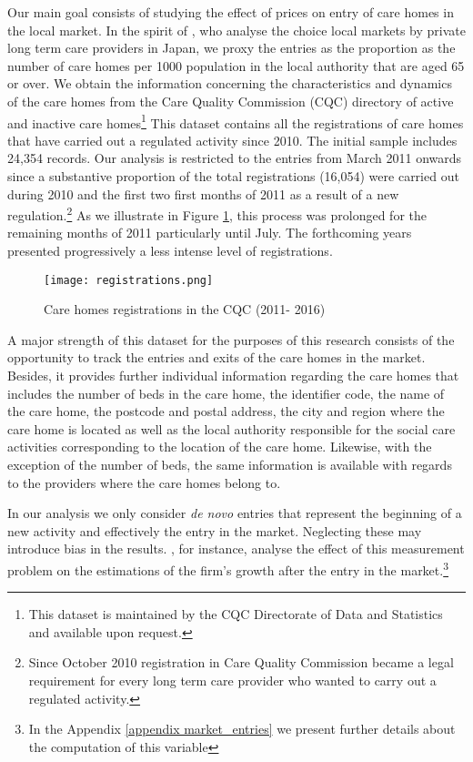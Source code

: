 \documentclass[12pt,letterpaper]{article}
\begin{document}
  
   Our main goal consists of studying the effect of prices on entry of care 
   homes in the local market. In the spirit of \citet{tokunaga2013factors}, who analyse
 the choice local markets by private long term care providers in Japan, we proxy the entries as the proportion as the number
  of care homes per 1000 population in the local authority that
 are aged 65 or over. We obtain the information concerning the characteristics and dynamics of the
care homes from the Care Quality Commission (CQC) directory of active and inactive
care homes\footnote{This dataset is maintained by the CQC Directorate of Data and Statistics and available upon request.}
This dataset contains all the registrations of care homes that have carried out a regulated activity since
   2010. The initial sample includes 24,354 records. Our analysis is restricted to the entries from March
    2011 onwards since a substantive proportion of the total registrations (16,054) were 
     carried out during 2010 and the first two first months of 2011 as a result 
     of a new regulation.\footnote{Since October 2010 registration in Care Quality Commission  became a legal requirement for every long 
     term care provider who wanted to carry out a regulated activity.} As we illustrate in Figure \ref{fig: registrations}, this process 
     was prolonged for the remaining months of 2011 particularly until July. The forthcoming years presented  
     progressively a less intense level of registrations.
     
\begin{figure}[ht]
\texttt{[image: registrations.png]}
\caption{Care homes registrations in the CQC (2011- 2016)}
\label{fig: registrations}
\end{figure}

A major strength of this dataset for the purposes of this research consists of the opportunity 
to track the entries and exits of the care homes in the market. Besides, it provides further
 individual information regarding the care homes that includes 
the number of beds in the care home, the identifier code, the name of the care home, the postcode and postal 
address, the city and region where the care home is located as well as the local authority responsible for the 
social care activities corresponding to the location of the care home. Likewise, with the exception of the number of
 beds, the same information is available with regards to the providers where the care homes belong to. 
 
 In our analysis we only consider \textit{de novo} entries that represent the 
 beginning of a new activity and effectively the entry in the market. Neglecting these may
   introduce bias in the results. \citet{geurts2016firm}, for instance, analyse the effect of this measurement
            problem on the estimations of the firm’s growth after the entry in the 
            market.\footnote{In the Appendix \ref{appendix market_entries} we present further details about the computation of this variable}
\end{document}
